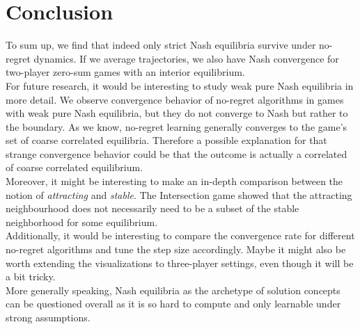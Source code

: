 
\chapter{Conclusion}\label{chapter:conclusion}

To sum up, we find that indeed only strict Nash equilibria survive under no-regret dynamics. If we average trajectories, we also have Nash convergence for two-player zero-sum games with an interior equilibrium. \\

For future research, it would be interesting to study weak pure Nash equilibria in more detail. We observe convergence behavior of no-regret algorithms in games with weak pure Nash equilibria, but they do not converge to Nash but rather to the boundary. As we know, no-regret learning generally converges to the game's set of coarse correlated equilibria. Therefore a possible explanation for that strange convergence behavior could be that the outcome is actually a correlated of coarse correlated equilibrium. \\

Moreover, it might be interesting to make an in-depth comparison between the notion of \textit{attracting} and \textit{stable}. The Intersection game showed that the attracting neighbourhood does not necessarily need to be a subset of the stable neighborhood for some equilibrium. \\

Additionally, it would be interesting to compare the convergence rate for different no-regret algorithms and tune the step size accordingly. Maybe it might also be worth extending the visualizations to three-player settings, even though it will be a bit tricky. \\

More generally speaking, Nash equilibria as the archetype of solution concepts can be questioned overall as it is so hard to compute and only learnable under strong assumptions. 